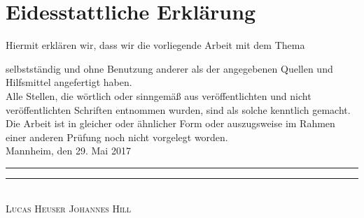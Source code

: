 \chapter*{Eidesstattliche Erklärung}

Hiermit erklären wir, dass wir die vorliegende Arbeit mit dem Thema
\begin{quote}
\textit{\titel}%
\end{quote}
selbstständig und ohne Benutzung anderer als der angegebenen Quellen und Hilfsmittel angefertigt haben. \\[2ex]
Alle Stellen, die wörtlich oder sinngemäß aus veröffentlichten und nicht veröffentlichten Schriften entnommen wurden, sind als solche kenntlich gemacht. \\[2ex]
Die Arbeit ist in gleicher oder ähnlicher Form oder auszugsweise im Rahmen einer anderen Prüfung noch nicht vorgelegt worden.
\\[10ex]


Mannheim, den 29. Mai 2017 \\[4ex]


\rule[-0.2cm]{5cm}{0.5pt} \hspace{4cm} \rule[-0.2cm]{5cm}{0.5pt} \\

\textsc{Lucas Heuser} \hspace{6,6cm} \textsc{Johannes Hill}

